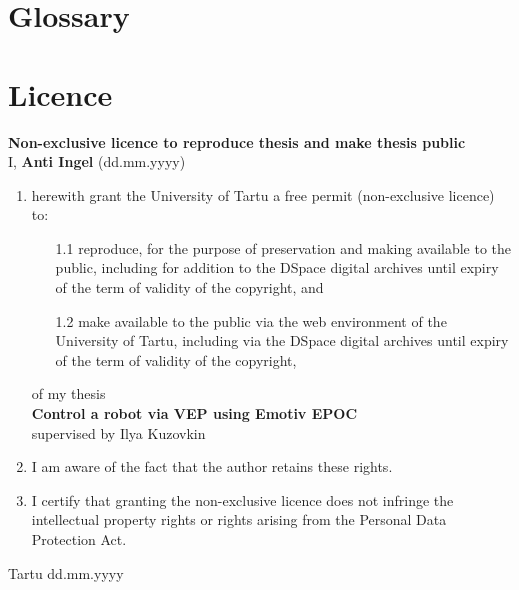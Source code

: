 
\begin{appendices}
\renewcommand{\thechapter}{\Roman{chapter}}
\chapter{Glossary}
\printglossary
\printglossary[type=\acronymtype]
\chapter{Licence}
\textbf{Non-exclusive licence to reproduce thesis and make thesis public}\\[1cm]

\noindent I, \textbf{Anti Ingel} (dd.mm.yyyy)

\begin{enumerate}
	\item herewith grant the University of Tartu a free permit (non-exclusive licence) to:
	\begin{enumerate}
		\item[1.1] reproduce, for the purpose of preservation and making available to the public, including for addition to the DSpace digital archives until expiry of the term of validity of the copyright, and
		\item[1.2] make available to the public via the web environment of the University of Tartu, including via the DSpace digital archives until expiry of the term of validity of the copyright,
	\end{enumerate}
	of my thesis\\
	\textbf{Control a robot via VEP using Emotiv EPOC}\\
	supervised by Ilya Kuzovkin
	\item I am aware of the fact that the author retains these rights.
	\item I certify that granting the non-exclusive licence does not infringe the intellectual property rights or rights arising from the Personal Data Protection Act.
\end{enumerate}
\vspace{1cm}
Tartu dd.mm.yyyy


\end{appendices}
